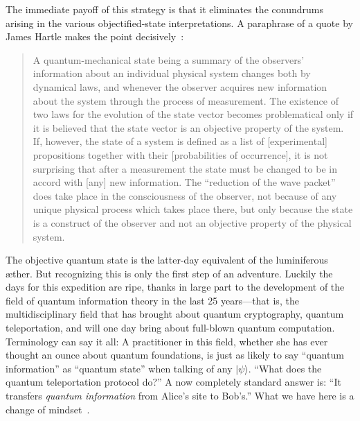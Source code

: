 \documentclass[aps,pra,superscriptaddress,10pt,tightenlines,twocolumn,nofootinbib]{revtex4}
\begin{document}
The immediate payoff of this strategy is that it eliminates the conundrums arising in the various objectified-state interpretations.  A paraphrase of a quote by James Hartle makes the point decisively~\cite{Hartle68}:
\begin{quote}
\noindent A quantum-mechanical state being a summary of the observers' information about an individual physical system changes both by
dynamical laws, and whenever the observer acquires new information about the system through the process of measurement.  The existence
of two laws for the evolution of the state vector becomes problematical only if it is believed that the state vector is an objective property of the system.   If, however, the state of a system is defined as a list of [experimental] propositions together with their [probabilities of occurrence], it is not surprising that after a measurement the state must be changed to be in accord with [any] new information.  The ``reduction of the wave packet'' does take place in the consciousness of the observer, not because of any unique physical process which takes place there, but only because the state is a construct of the observer and not an objective property of the physical system.
\end{quote}

The objective quantum state is the latter-day equivalent of the
luminiferous {\ae}ther.  But recognizing this is only the first step
of an adventure.  Luckily the days for this expedition are ripe, thanks in large part to the development of the field of quantum information theory in the last 25 years---that is, the multidisciplinary field that has brought about quantum cryptography, quantum teleportation, and will one day bring about full-blown quantum computation.  Terminology can say it all:  A practitioner in this field, whether she has ever thought an ounce about quantum foundations, is just as likely to say ``quantum information'' as ``quantum state'' when talking of any $|\psi\rangle$.  ``What does the quantum teleportation protocol do?''  A now completely standard answer is: ``It transfers {\it quantum information\/} from Alice's site to Bob's.''  What we have here is a change of mindset~\cite{Fuchs10}.
\end{document}
